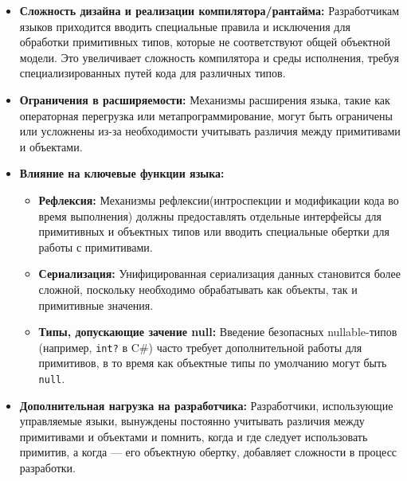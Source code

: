 \begin{itemize}[leftmargin=*,nosep]
    \item \textbf{Сложность дизайна и реализации компилятора/рантайма:} Разработчикам языков приходится вводить специальные правила и исключения для обработки примитивных типов, которые не соответствуют общей объектной модели. Это увеличивает сложность компилятора и среды исполнения, требуя специализированных путей кода для различных типов.

    \item \textbf{Ограничения в расширяемости:} Механизмы расширения языка, такие как операторная перегрузка или метапрограммирование, могут быть ограничены или усложнены из-за необходимости учитывать различия между примитивами и объектами.

    \item \textbf{Влияние на ключевые функции языка:}
    \begin{itemize}
        \item \textbf{Рефлексия:} Механизмы рефлексии(интроспекции и модификации кода во время выполнения) должны предоставлять отдельные интерфейсы для примитивных и объектных типов или вводить специальные обертки для работы с примитивами.
        \item \textbf{Сериализация:} Унифицированная сериализация данных становится более сложной, поскольку необходимо обрабатывать как объекты, так и примитивные значения.
        \item \textbf{Типы, допускающие зачение null:} Введение безопасных nullable-типов (например, \texttt{int?} в C\#) часто требует дополнительной работы для примитивов, в то время как объектные типы по умолчанию могут быть \texttt{null}.
    \end{itemize}

    \item \textbf{Дополнительная нагрузка на разработчика:} Разработчики, использующие управляемые языки, вынуждены постоянно учитывать различия между примитивами и объектами и помнить, когда и где следует использовать примитив, а когда — его объектную обертку, добавляет сложности в процесс разработки.
\end{itemize}
